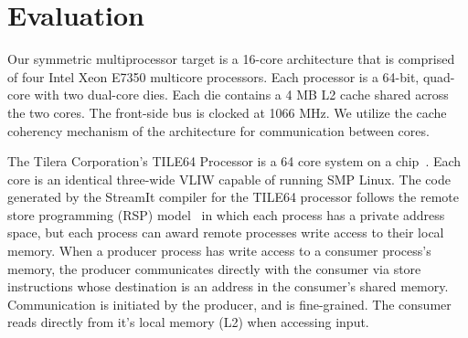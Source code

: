 \section{Evaluation}
\label{sec:eval}

Our symmetric multiprocessor target is a 16-core architecture that is
comprised of four Intel Xeon E7350 multicore processors.  Each processor
is a 64-bit, quad-core with two dual-core dies.  Each die contains a 4
MB L2 cache shared across the two cores.  The front-side bus is clocked
at 1066 MHz.  We utilize the cache coherency mechanism of the
architecture for communication between cores. 

The Tilera Corporation's TILE64 Processor is a 64 core system on a
chip~\cite{tilera}.  Each core is an identical three-wide VLIW capable
of running SMP Linux. The code generated by the
StreamIt compiler for the TILE64 processor follows the remote store
programming (RSP) model~\cite{rsp10} in which each process has a
private address space, but each process can award remote processes write
access to their local memory. When a producer process has write access
to a consumer process's memory, the producer communicates directly with
the consumer via store instructions whose destination is an address in
the consumer's shared memory.  Communication is initiated by the
producer, and is fine-grained.  The consumer reads directly from it's
local memory (L2) when accessing input.

